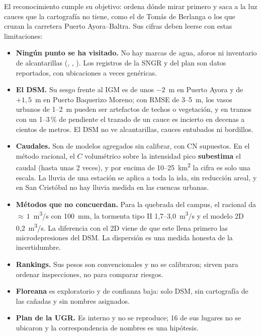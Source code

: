 \documentclass{sosg-informe}
\newcommand{\kmc}{km\textsuperscript{2}}
\newcommand{\mcs}{m\textsuperscript{3}/s}
\begin{document}
El reconocimiento cumple su objetivo: ordena dónde mirar primero y saca a la luz cauces que la cartografía no tiene, como el de Tomás de Berlanga o los que cruzan la carretera Puerto Ayora--Baltra. Sus cifras deben leerse con estas limitaciones:
\begin{itemize}
  \item \textbf{Ningún punto se ha visitado.} No hay marcas de agua, aforos ni inventario de alcantarillas (, , ). Los registros de la SNGR y del plan son datos reportados, con ubicaciones a veces genéricas.
  \item \textbf{El DSM.} Su sesgo frente al IGM es de unos $-2$~m en Puerto Ayora y de $+1{,}5$~m en Puerto Baquerizo Moreno; con RMSE de 3--5~m, los vasos urbanos de 1--2~m pueden ser artefactos de techos o vegetación, y en tramos con un 1--3\,\% de pendiente el trazado de un cauce es incierto en decenas a cientos de metros. El DSM no ve alcantarillas, cauces entubados ni bordillos.
  \item \textbf{Caudales.} Son de modelos agregados sin calibrar, con CN supuestos. En el método racional, el $C$ volumétrico sobre la intensidad pico \textbf{subestima} el caudal (hasta unas 2 veces), y por encima de 10--25~\kmc{} la cifra es solo una escala. La lluvia de una estación se aplica a toda la isla, sin reducción areal, y en San Cristóbal no hay lluvia medida en las cuencas urbanas.
  \item \textbf{Métodos que no concuerdan.} Para la quebrada del campus, el racional da ${\approx}\,1$~\mcs{} con 100~mm, la tormenta tipo II 1,7--3,0~\mcs{} y el modelo 2D 0,2~\mcs. La diferencia con el 2D viene de que este llena primero las microdepresiones del DSM. La dispersión es una medida honesta de la incertidumbre.
  \item \textbf{Rankings.} Sus pesos son convencionales y no se calibraron; sirven para ordenar inspecciones, no para comparar riesgos.
  \item \textbf{Floreana} es exploratorio y de confianza baja: solo DSM, sin cartografía de las cañadas y sin nombres asignados.
  \item \textbf{Plan de la UGR.} Es interno y no se reproduce; 16 de sus lugares no se ubicaron y la correspondencia de nombres es una hipótesis.
\end{itemize}

\end{document}
